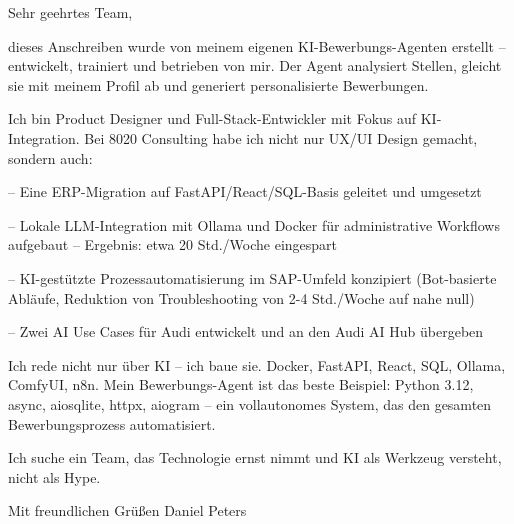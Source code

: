Sehr geehrtes Team,

dieses Anschreiben wurde von meinem eigenen KI-Bewerbungs-Agenten erstellt --
entwickelt, trainiert und betrieben von mir. Der Agent analysiert Stellen,
gleicht sie mit meinem Profil ab und generiert personalisierte Bewerbungen.

Ich bin Product Designer und Full-Stack-Entwickler mit Fokus auf KI-Integration.
Bei 8020 Consulting habe ich nicht nur UX/UI Design gemacht, sondern auch:

-- Eine ERP-Migration auf FastAPI/React/SQL-Basis geleitet und umgesetzt

-- Lokale LLM-Integration mit Ollama und Docker für administrative Workflows
   aufgebaut -- Ergebnis: etwa 20 Std./Woche eingespart

-- KI-gestützte Prozessautomatisierung im SAP-Umfeld konzipiert (Bot-basierte
   Abläufe, Reduktion von Troubleshooting von 2-4 Std./Woche auf nahe null)

-- Zwei AI Use Cases für Audi entwickelt und an den Audi AI Hub übergeben

Ich rede nicht nur über KI -- ich baue sie. Docker, FastAPI, React, SQL, Ollama,
ComfyUI, n8n. Mein Bewerbungs-Agent ist das beste Beispiel: Python 3.12, async,
aiosqlite, httpx, aiogram -- ein vollautonomes System, das den gesamten
Bewerbungsprozess automatisiert.

Ich suche ein Team, das Technologie ernst nimmt und KI als Werkzeug versteht,
nicht als Hype.

Mit freundlichen Grüßen
Daniel Peters
